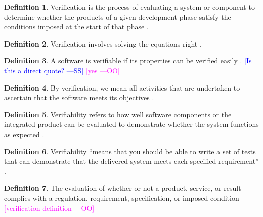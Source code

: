 \documentclass[letterpaper, cleveref]{lipics-v2019}
\newcommand{\authornote}[3]{\textcolor{#1}{[#3 ---#2]}}
\newcommand{\authornote}[3]{}
\newcommand{\wss}[1]{\authornote{blue}{SS}{#1}} %
\newcommand{\oo}[1]{\authornote{magenta}{OO}{#1}} %
\theoremstyle{definition}
\newtheorem{defn}{Definition}
\begin{document}
\begin{defn}
	 Verification is the process of evaluating a system or component to
   determine whether the products of a given development phase satisfy the
   conditions imposed at the start of that phase
   \citep{IEEEStdGlossarySET1990}.
\end{defn}

\begin{defn}
	Verification involves solving the equations right \citep[p.~23]{Roache1998}.
\end{defn}

\begin{defn}
  A software is verifiable if its properties can be verified easily
  \citep{GhezziEtAl2003}.  \wss{Is this a direct quote?} \oo{yes}
\end{defn}

\begin{defn}
	By verification, we mean all activities that are undertaken to ascertain
  that the software meets its objectives \citep{GhezziEtAl2003}.
\end{defn}

\begin{defn}
	Verifiability refers to how well software components or the integrated
  product can be evaluated to demonstrate whether the system functions as
  expected \citep{wiegers2003softreq}.
\end{defn}

\begin{defn} \label{Defn_Verifiability1}
  Verifiability ``means that you should be able to write a set of tests that
  can demonstrate that the delivered system meets each specified
  requirement'' \citep{sommerville}. %
\end{defn}

\begin{defn}
	The evaluation of whether or not a product, service, or result complies
  with a regulation, requirement, specification, or imposed condition
  \citep{project2017guide} \oo {verification definition}
\end{defn}
\end{document}
